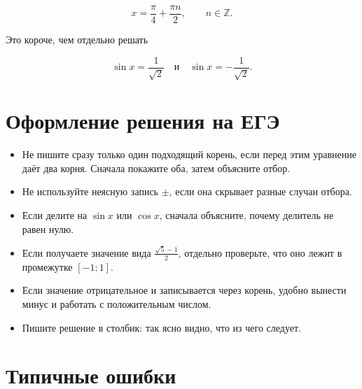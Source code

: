 \documentclass[a4paper,12pt]{article}
\newcommand{\Z}{\mathbb{Z}}
\begin{document}
\[
x=\frac{\pi}{4}+\frac{\pi n}{2},\qquad n\in\Z.
\]

Это короче, чем отдельно решать

\[
\sin x=\frac1{\sqrt2}
\quad\text{и}\quad
\sin x=-\frac1{\sqrt2}.
\]

\section{Оформление решения на ЕГЭ}

\begin{itemize}
  \item Не пишите сразу только один подходящий корень, если перед этим уравнение даёт два корня. Сначала покажите оба, затем объясните отбор.
  \item Не используйте неясную запись \(\pm\), если она скрывает разные случаи отбора.
  \item Если делите на \(\sin x\) или \(\cos x\), сначала объясните, почему делитель не равен нулю.
  \item Если получаете значение вида \(\frac{\sqrt5-1}{2}\), отдельно проверьте, что оно лежит в промежутке \([-1;1]\).
  \item Если значение отрицательное и записывается через корень, удобно вынести минус и работать с положительным числом.
  \item Пишите решение в столбик: так ясно видно, что из чего следует.
\end{itemize}

\section{Типичные ошибки}
\end{document}
